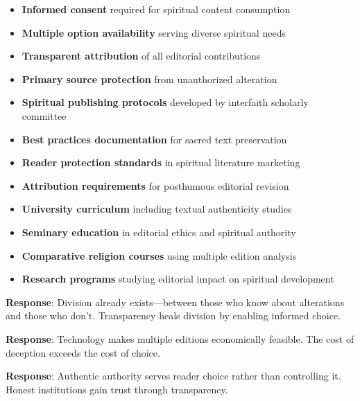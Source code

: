\documentclass[12pt,twoside]{book}
\begin{document}
\begin{itemize}
\item \textbf{\textbf{Informed consent}} required for spiritual content consumption
\item \textbf{\textbf{Multiple option availability}} serving diverse spiritual needs
\item \textbf{\textbf{Transparent attribution}} of all editorial contributions
\item \textbf{\textbf{Primary source protection}} from unauthorized alteration

\item \textbf{\textbf{Spiritual publishing protocols}} developed by interfaith scholarly committee
\item \textbf{\textbf{Best practices documentation}} for sacred text preservation
\item \textbf{\textbf{Reader protection standards}} in spiritual literature marketing
\item \textbf{\textbf{Attribution requirements}} for posthumous editorial revision

\item \textbf{\textbf{University curriculum}} including textual authenticity studies
\item \textbf{\textbf{Seminary education}} in editorial ethics and spiritual authority
\item \textbf{\textbf{Comparative religion courses}} using multiple edition analysis
\item \textbf{\textbf{Research programs}} studying editorial impact on spiritual development
\end{itemize}

\textbf{\textbf{Response}}: Division already exists—between those who know about alterations and those who don't. Transparency heals division by enabling informed choice.

\textbf{\textbf{Response}}: Technology makes multiple editions economically feasible. The cost of deception exceeds the cost of choice.

\textbf{\textbf{Response}}: Authentic authority serves reader choice rather than controlling it. Honest institutions gain trust through transparency.
\end{document}
